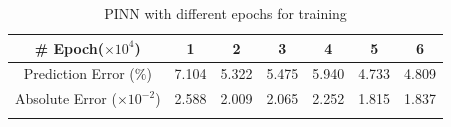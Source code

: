 
\begin{table}[t]
\small
\centering
\begin{tabular}{c|cccccc}
\Xhline{3\arrayrulewidth}
\# Epoch($\times 10^{4}$)          & 1                          & 2                          & 3      & 4   & 5   &6                   \\ \hline
Prediction Error ($\%$) & 7.104& 5.322  & 5.475  & 5.940 & 4.733 & 4.809 \\\hline
Absolute Error ($\times 10^{-2}$) & 2.588 & 2.009 &  2.065 & 2.252 &1.815&1.837\\\Xhline{3\arrayrulewidth}
\end{tabular}
\caption{PINN with different epochs for training}
\label{tab:pinn_epoch}
\end{table}